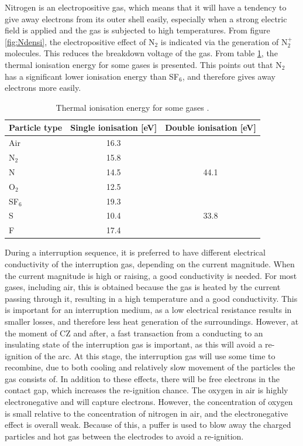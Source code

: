 \documentclass[10pt,b5paper,twoside]{article}
\begin{document}
Nitrogen is an electropositive gas, which means that it will have a tendency to give away electrons from its outer shell easily, especially when a strong electric field is applied and the gas is subjected to high temperatures. From figure \ref{fig:Ndensi}, the electropositive effect of N$_2$ is indicated via the generation of N$_{2}^{+}$ molecules. This reduces the breakdown voltage of the gas. From table \ref{tab:thermalIonisation}, the thermal ionisation energy for some gases is presented. This points out that N$_2$ has a significant lower ionisation energy than SF$_6$, and therefore gives away electrons more easily.

\begin{table}[H]
\center
\caption{Thermal ionisation energy for some gases \cite{bib:HVEbreak}.}
\begin{tabular}{|l|c|c|}
\hline 
Particle type & Single ionisation [eV] & Double ionisation [eV] \\ 
\hline 
Air & 16.3 &  \\ 
\hline 
N$_2$ & 15.8 &  \\ 
\hline 
N & 14.5 & 44.1 \\ 
\hline 
O$_2$ & 12.5 &  \\ 
\hline 
SF$_6$ & 19.3 &  \\ 
\hline 
S & 10.4 & 33.8 \\ 
\hline 
F & 17.4 &  \\ 
\hline 
\end{tabular} 
\label{tab:thermalIonisation}
\end{table}

During a interruption sequence, it is preferred to have different electrical conductivity of the interruption gas, depending on the current magnitude. When the current magnitude is high or raising, a good conductivity is needed. For most gases, including air, this is obtained because the gas is heated by the current passing through it, resulting in a high temperature and a good conductivity. This is important for an interruption medium, as a low electrical resistance results in smaller losses, and therefore less heat generation of the surroundings. However, at the moment of CZ and after, a fast transaction from a conducting to an insulating state of the interruption gas is important, as this will avoid a re-ignition of the arc. At this stage, the interruption gas will use some time to recombine, due to both cooling and relatively slow movement of the particles the gas consists of. In addition to these effects, there will be free electrons in the contact gap, which increases the re-ignition chance. The oxygen in air is highly electronegative and will capture electrons. However, the concentration of oxygen is small relative to the concentration of nitrogen in air, and the electronegative effect is overall weak. Because of this, a puffer is used to blow away the charged particles and hot gas between the electrodes to avoid a re-ignition.
\end{document}
